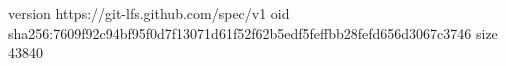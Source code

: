 version https://git-lfs.github.com/spec/v1
oid sha256:7609f92c94bf95f0d7f13071d61f52f62b5edf5feffbb28fefd656d3067c3746
size 43840
